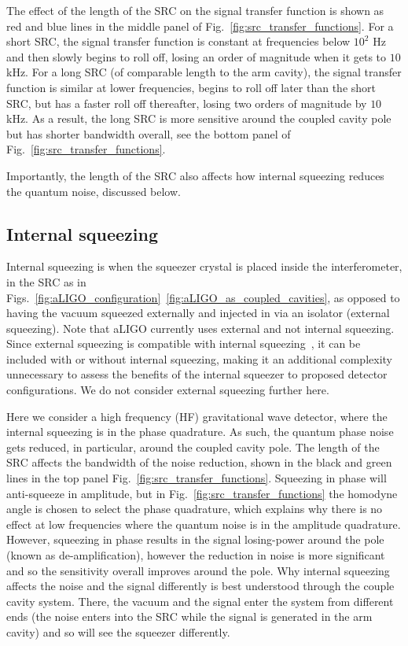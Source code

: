 \documentclass[aps,pra,superscriptaddress,reprint,nofootinbib]{revtex4-1}
\begin{document}
The effect of the length of the SRC on the signal transfer function is shown as red and blue lines in the middle panel of Fig.~\ref{fig:src_transfer_functions}.
For a short SRC, the signal transfer function is constant at frequencies below $10^2$ Hz and then slowly begins to roll off, losing an order of magnitude when it gets to $10$ kHz. For a long SRC (of comparable length to the arm cavity), the signal transfer function is similar at lower frequencies, begins to roll off later than the short SRC, but has a faster roll off thereafter, losing two orders of magnitude by $10$ kHz. As a result, the long SRC is more sensitive around the coupled cavity pole but has shorter bandwidth overall, see the bottom panel of Fig.~\ref{fig:src_transfer_functions}.


Importantly, the length of the SRC also affects how internal squeezing reduces the quantum noise, discussed below.

\subsection{Internal squeezing}
\label{sec:internal_squeezing}

Internal squeezing is when the squeezer crystal is placed inside the interferometer, in the SRC as in Figs.~\ref{fig:aLIGO_configuration}~\ref{fig:aLIGO_as_coupled_cavities}, as opposed to having the vacuum squeezed externally and injected in via an isolator (external squeezing). Note that aLIGO currently uses external and not internal squeezing. Since external squeezing is compatible with internal squeezing~\cite{Adya_2020,Korobko_2019}, it can be included with or without internal squeezing, making it an additional complexity unnecessary to assess the benefits of the internal squeezer to proposed detector configurations. We do not consider external squeezing further here.


Here we consider a high frequency (HF) gravitational wave detector, where the internal squeezing is in the phase quadrature. As such, the quantum phase noise gets reduced, in particular, around the coupled cavity pole. The length of the SRC affects the bandwidth of the noise reduction, shown in the black and green lines in the top panel Fig.~\ref{fig:src_transfer_functions}.
Squeezing in phase will anti-squeeze in amplitude, but in Fig.~\ref{fig:src_transfer_functions} the homodyne angle is chosen to select the phase quadrature, which explains why there is no effect at low frequencies where the quantum noise is in the amplitude quadrature. 
However, squeezing in phase results in the signal losing-power around the pole (known as de-amplification), however the reduction in noise is more significant and so the sensitivity overall improves around the pole.
Why internal squeezing affects the noise and the signal differently is best understood through the couple cavity system. There, the vacuum and the signal enter the system from different ends (the noise enters into the SRC while the signal is generated in the arm cavity) and so will see the squeezer differently.
\end{document}
